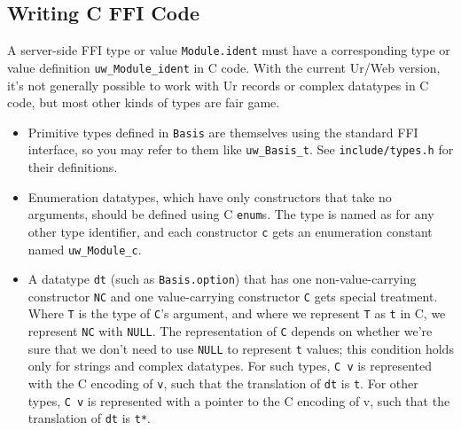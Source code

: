 \documentclass{article}
\begin{document}
\subsection{Writing C FFI Code}

A server-side FFI type or value \texttt{Module.ident} must have a corresponding type or value definition \texttt{uw\_Module\_ident} in C code.  With the current Ur/Web version, it's not generally possible to work with Ur records or complex datatypes in C code, but most other kinds of types are fair game.

\begin{itemize}
  \item Primitive types defined in \texttt{Basis} are themselves using the standard FFI interface, so you may refer to them like \texttt{uw\_Basis\_t}.  See \texttt{include/types.h} for their definitions.
  \item Enumeration datatypes, which have only constructors that take no arguments, should be defined using C \texttt{enum}s.  The type is named as for any other type identifier, and each constructor \texttt{c} gets an enumeration constant named \texttt{uw\_Module\_c}.
  \item A datatype \texttt{dt} (such as \texttt{Basis.option}) that has one non-value-carrying constructor \texttt{NC} and one value-carrying constructor \texttt{C} gets special treatment.  Where \texttt{T} is the type of \texttt{C}'s argument, and where we represent \texttt{T} as \texttt{t} in C, we represent \texttt{NC} with \texttt{NULL}.  The representation of \texttt{C} depends on whether we're sure that we don't need to use \texttt{NULL} to represent \texttt{t} values; this condition holds only for strings and complex datatypes.  For such types, \texttt{C v} is represented with the C encoding of \texttt{v}, such that the translation of \texttt{dt} is \texttt{t}.  For other types, \texttt{C v} is represented with a pointer to the C encoding of v, such that the translation of \texttt{dt} is \texttt{t*}.
\end{itemize}
\end{document}
